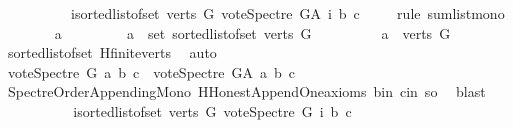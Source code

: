 \begin{isabellebody}
\ \ \ \ \ \ \ \ \ \ {\isacharparenleft}{\kern0pt}{\isasymSum}i{\isasymleftarrow}sorted{\isacharunderscore}{\kern0pt}list{\isacharunderscore}{\kern0pt}of{\isacharunderscore}{\kern0pt}set\ {\isacharparenleft}{\kern0pt}verts\ G{\isacharparenright}{\kern0pt}{\isachardot}{\kern0pt}\ vote{\isacharunderscore}{\kern0pt}Spectre\ G{\isacharunderscore}{\kern0pt}A\ i\ b\ c{\isacharparenright}{\kern0pt}{\isachardoublequoteclose}\isanewline
\ \ \ \ \isamarkupfalse%
{\isacharparenleft}{\kern0pt}rule\ sum{\isacharunderscore}{\kern0pt}list{\isacharunderscore}{\kern0pt}mono{\isacharparenright}{\kern0pt}\isanewline
\ \ \ \ \ \ \isamarkupfalse%
\ a\ \isanewline
\ \ \ \ \ \ \isamarkupfalse%
\ {\isachardoublequoteopen}a\ {\isasymin}\ set\ {\isacharparenleft}{\kern0pt}sorted{\isacharunderscore}{\kern0pt}list{\isacharunderscore}{\kern0pt}of{\isacharunderscore}{\kern0pt}set\ {\isacharparenleft}{\kern0pt}verts\ G{\isacharparenright}{\kern0pt}{\isacharparenright}{\kern0pt}{\isachardoublequoteclose}\isanewline
\ \ \ \ \ \ \isamarkupfalse%
\ \isamarkupfalse%
\ {\isachardoublequoteopen}a\ {\isasymin}\ verts\ G{\isachardoublequoteclose}\ \isamarkupfalse%
\ sorted{\isacharunderscore}{\kern0pt}list{\isacharunderscore}{\kern0pt}of{\isacharunderscore}{\kern0pt}set{\isacharparenleft}{\kern0pt}{}{\isacharparenright}{\kern0pt}\ H{}{\isachardot}{\kern0pt}finite{\isacharunderscore}{\kern0pt}verts\ \isamarkupfalse%
\ auto\isanewline
\ \ \ \ \ \ \isamarkupfalse%
\ \isamarkupfalse%
\ {\isachardoublequoteopen}vote{\isacharunderscore}{\kern0pt}Spectre\ G\ a\ b\ c\ {\isasymle}\ vote{\isacharunderscore}{\kern0pt}Spectre\ G{\isacharunderscore}{\kern0pt}A\ a\ b\ c{\isachardoublequoteclose}\isanewline
\ \ \ \ \ \ \ \ \isamarkupfalse%
\ Spectre{\isacharunderscore}{\kern0pt}Order{\isacharunderscore}{\kern0pt}Appending{\isacharunderscore}{\kern0pt}Mono\ H{}{\isachardot}{\kern0pt}Honest{\isacharunderscore}{\kern0pt}Append{\isacharunderscore}{\kern0pt}One{\isacharunderscore}{\kern0pt}axioms\ b{\isacharunderscore}{\kern0pt}in\ c{\isacharunderscore}{\kern0pt}in\ so\ \isamarkupfalse%
\ blast\isanewline
\ \ \ \ \isamarkupfalse%
\isanewline
\ \ \ \ \isamarkupfalse%
\ {\isachardoublequoteopen}{\isacharparenleft}{\kern0pt}{\isasymSum}i{\isasymleftarrow}sorted{\isacharunderscore}{\kern0pt}list{\isacharunderscore}{\kern0pt}of{\isacharunderscore}{\kern0pt}set\ {\isacharparenleft}{\kern0pt}verts\ G{\isacharparenright}{\kern0pt}{\isachardot}{\kern0pt}\ vote{\isacharunderscore}{\kern0pt}Spectre\ G\ i\ b\ c{\isacharparenright}{\kern0pt}\ {\isasymle}\isanewline

\end{isabellebody}
